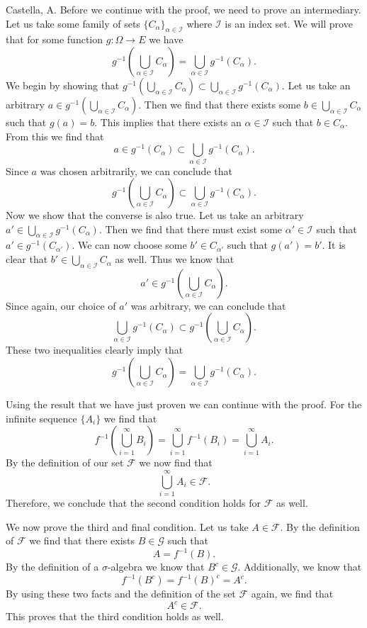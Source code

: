 \begin{solution}[2.4]{Castella, A.}
    Before we continue with the proof, we need to prove an intermediary. Let us take some family of sets $\{C_\alpha\}_{\alpha\in\mathcal{I}}$ where $\mathcal{I}$ is an index set. We will prove that for some function $g : \Omega \rightarrow E$ we have
    $$
        g^{-1}\left(\bigcup_{\alpha\in\mathcal{I}}C_\alpha\right) = \bigcup_{\alpha\in\mathcal{I}}g^{-1}(C_\alpha).
    $$
    We begin by showing that $g^{-1}\left(\bigcup_{\alpha\in\mathcal{I}}C_\alpha\right) \subset \bigcup_{\alpha\in\mathcal{I}}g^{-1}(C_\alpha)$. Let us take an arbitrary $a \in g^{-1}\left(\bigcup_{\alpha\in\mathcal{I}}C_\alpha\right)$. Then we find that there exists some $b \in \bigcup_{\alpha\in\mathcal{I}}C_\alpha$ such that $g(a) = b$. This implies that there exists an $\alpha \in \mathcal{I}$ such that $b \in C_\alpha$. From this we find that
    $$
        a \in g^{-1}(C_\alpha) \subset \bigcup_{\alpha\in\mathcal{I}}g^{-1}(C_\alpha).
    $$
    Since $a$ was chosen arbitrarily, we can conclude that
    $$
        g^{-1}\left(\bigcup_{\alpha\in\mathcal{I}}C_\alpha\right) \subset \bigcup_{\alpha\in\mathcal{I}}g^{-1}(C_\alpha).
    $$
    Now we show that the converse is also true. Let us take an arbitrary $a' \in \bigcup_{\alpha\in\mathcal{I}}g^{-1}(C_\alpha)$. Then we find that there must exist some $\alpha' \in \mathcal{I}$ such that $a' \in g^{-1}(C_{\alpha'})$. We can now choose some $b' \in C_{\alpha'}$ such that $g(a') = b'$. It is clear that $b' \in \bigcup_{\alpha\in\mathcal{I}}C_\alpha$ as well. Thus we know that
    $$
        a' \in g^{-1}\left(\bigcup_{\alpha\in\mathcal{I}}C_\alpha\right).
    $$
    Since again, our choice of $a'$ was arbitrary, we can conclude that
    $$
        \bigcup_{\alpha\in\mathcal{I}}g^{-1}(C_\alpha) \subset g^{-1}\left(\bigcup_{\alpha\in\mathcal{I}}C_\alpha\right).
    $$
    These two inequalities clearly imply that
    $$
        g^{-1}\left(\bigcup_{\alpha\in\mathcal{I}}C_\alpha\right) = \bigcup_{\alpha\in\mathcal{I}}g^{-1}(C_\alpha).
    $$

    Using the result that we have just proven we can continue with the proof. For the infinite sequence $\{A_i\}$ we find that
    $$
        f^{-1}\left(\bigcup_{i=1}^\infty B_i\right) = \bigcup_{i=1}^\infty f^{-1}(B_i) = \bigcup_{i=1}^\infty A_i.
    $$
    By the definition of our set $\mathcal{F}$ we now find that
    $$
        \bigcup_{i=1}^\infty A_i \in \mathcal{F}.
    $$
    Therefore, we conclude that the second condition holds for $\mathcal{F}$ as well.

    We now prove the third and final condition. Let us take $A \in \mathcal{F}$. By the definition of $\mathcal{F}$ we find that there exists $B \in \mathcal{G}$ such that
    $$
        A = f^{-1}(B).
    $$
    By the definition of a $\sigma$-algebra we know that $B^c \in \mathcal{G}$. Additionally, we know that
    $$
        f^{-1}(B^c) = f^{-1}(B)^c = A^c.
    $$
    By using these two facts and the definition of the set $\mathcal{F}$ again, we find that
    $$
        A^c \in \mathcal{F}.
    $$
    This proves that the third condition holds as well.


\end{solution}
